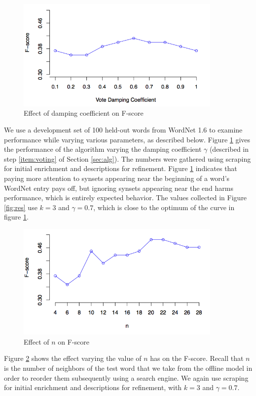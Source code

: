 \documentclass{article}
\begin{document}
\begin{figure}[htbp]
\begin{center}
\includegraphics[width=100mm]{graphs/damping.png}
\end{center}
\caption{Effect of damping coefficient on F-score}
\label{fig:damping}
\end{figure}
We use a development set of 100 held-out words from WordNet 1.6 to examine performance while varying various parameters, as described below.
Figure \ref{fig:damping} gives the performance of the algorithm varying the damping coefficient $\gamma$ (described in step \ref{item:voting} of Section \ref{sec:alg}).
The numbers were gathered using scraping for initial enrichment and descriptions for refinement.
Figure \ref{fig:damping} indicates that paying more attention to synsets appearing near the beginning of a word's WordNet entry pays off, but ignoring synsets appearing near the end harms performance, which is entirely expected behavior.
The values collected in Figure \ref{fig:res} use $k=3$ and $\gamma=0.7$, which is close to the optimum of the curve in figure \ref{fig:damping}.

\begin{figure}[htbp]
\begin{center}
\includegraphics[width=100mm]{graphs/n.png}
\end{center}
\caption{Effect of $n$ on F-score}
\label{fig:n}
\end{figure}
Figure \ref{fig:n} shows the effect varying the value of $n$ has on the F-score.
Recall that $n$ is the number of neighbors of the test word that we take from the offline model in order to reorder them subsequently using a search engine.
We again use scraping for initial enrichment and descriptions for refinement, with $k=3$ and $\gamma=0.7$.
\end{document}
